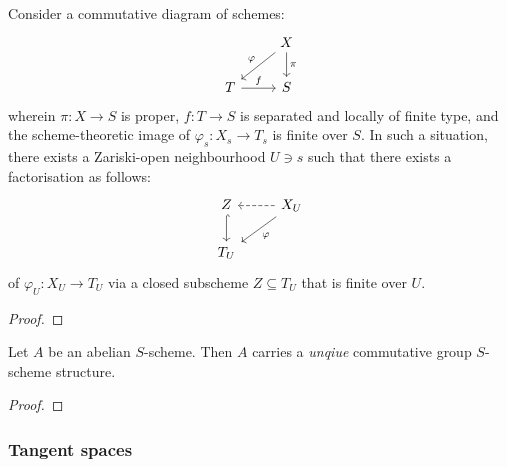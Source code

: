             \begin{theorem}[Rigidity II] \label{theorem: rigidity_theorem_for_abelian_varieties_2}
                \cite[\href{https://stacks.math.columbia.edu/tag/0AH8}{Tag 0AH8}]{stacks} Consider a commutative diagram of schemes:
                    $$
                        \begin{tikzcd}
                        	& X \\
                        	T & S
                        	\arrow["\pi", from=1-2, to=2-2]
                        	\arrow["f", from=2-1, to=2-2]
                        	\arrow["\varphi"', from=1-2, to=2-1]
                        \end{tikzcd}
                    $$
                wherein $\pi: X \to S$ is proper, $f: T \to S$ is separated and locally of finite type, and the scheme-theoretic image of $\varphi_s: X_s \to T_s$ is finite over $S$. In such a situation, there exists a Zariski-open neighbourhood $U \ni s$ such that there exists a factorisation as follows:
                    $$
                        \begin{tikzcd}
                        	Z & {X_U} \\
                        	{T_U}
                        	\arrow["\varphi", from=1-2, to=2-1]
                        	\arrow[hook, from=1-1, to=2-1]
                        	\arrow[dashed, from=1-2, to=1-1]
                        \end{tikzcd}
                    $$
                of $\varphi_U: X_U \to T_U$ via a closed subscheme $Z \subseteq T_U$ that is finite over $U$.
            \end{theorem}
                \begin{proof}
                    
                \end{proof}
            \begin{corollary} \label{coro: abelian_schemes_are_commutative_group_schemes} 
                Let $A$ be an abelian $S$-scheme. Then $A$ carries a \textit{unqiue} commutative group $S$-scheme structure.
            \end{corollary}
                \begin{proof}
                    
                \end{proof}
                
        \subsubsection{Tangent spaces}
        
